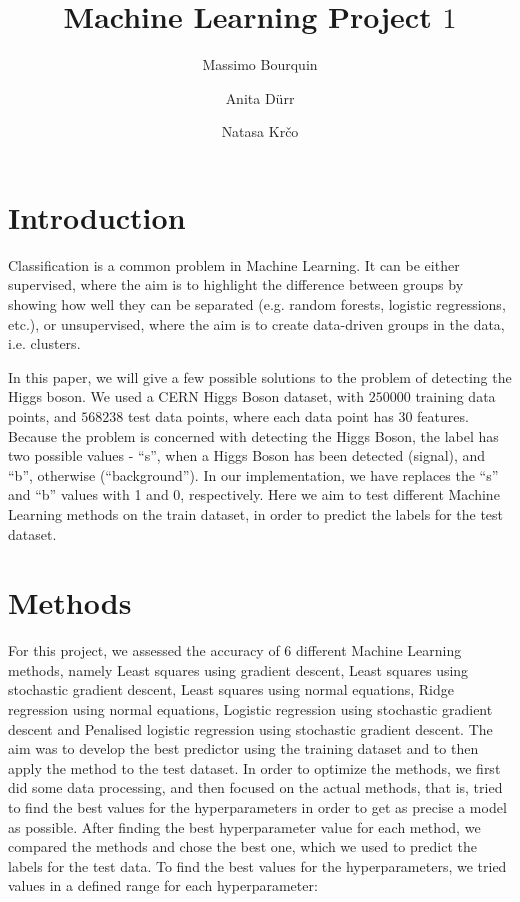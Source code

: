\documentclass{article}
\begin{document}
	\title{Machine Learning Project $1$}

	\author{Massimo Bourquin \and Anita D\" urr \and Natasa Kr\v co}

	\maketitle

	\section{Introduction}

	Classification is a common problem in Machine Learning. It can be either supervised, where the aim is to highlight the difference between groups by showing how well they can be separated (e.g. random forests, logistic regressions, etc.), or unsupervised, where the aim is to create data-driven groups in the data, i.e. clusters.

	In this paper, we will give a few possible solutions to the problem of detecting the Higgs boson. We used a CERN Higgs Boson dataset, with $250000$ training data points, and $568238$ test data points, where each data point has 30 features. Because the problem is concerned with detecting the Higgs Boson, the label has two possible values - “s”, when a Higgs Boson has been detected (signal), and “b”, otherwise (“background”). In our implementation, we have replaces the “s” and “b” values with 1 and 0, respectively.
	Here we aim to test different Machine Learning methods on the train dataset, in order to predict the labels for the test dataset.


	\section{Methods}
	For this project, we assessed the accuracy of 6 different Machine Learning methods, namely Least squares using gradient descent, Least squares using stochastic gradient descent, Least squares using normal equations, Ridge regression using normal equations, Logistic regression using stochastic gradient descent and Penalised logistic regression using stochastic gradient descent. The aim was to develop the best predictor using the training dataset and to then apply the method to the test dataset.
	In order to optimize the methods, we first did some data processing, and then focused on the actual methods, that is, tried to find the best values for the hyperparameters in order to get as precise a model as possible. After finding the best hyperparameter value for each method, we compared the methods and chose the best one, which we used to predict the labels for the test data. To find the best values for the hyperparameters, we tried values in a defined range for each hyperparameter:
\end{document}
